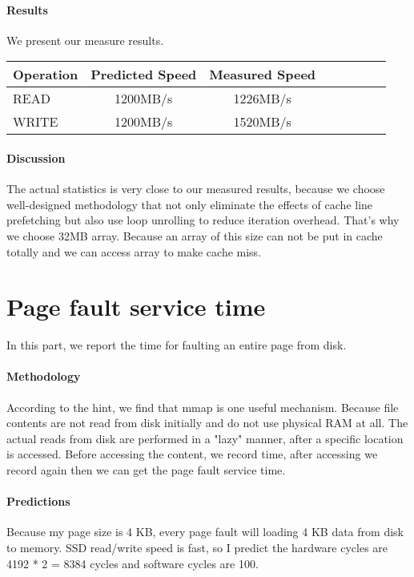 \paragraph{Results}
We present our measure results.

\begin{center}
\begin{tabular}{l*{6}{c}r}
Operation             & Predicted Speed & Measured Speed  \\
\hline
READ & 1200MB/s & 1226MB/s \\
WRITE & 1200MB/s & 1520MB/s \\

\end{tabular}
\end{center}

\paragraph{Discussion}
The actual statistics is very close to our measured results, because we choose well-designed methodology that not only eliminate the effects of cache line prefetching but also use loop unrolling to reduce iteration overhead. That's why we choose 32MB array. Because an array of this size can not be put in cache totally and we can access array to make cache miss.

\section{Page fault service time}
In this part, we report the time for faulting an entire page from disk.

\paragraph{Methodology}
According to the hint, we find that mmap is one useful mechanism. Because file contents are not read from disk initially and do not use physical RAM at all. The actual reads from disk are performed in a "lazy" manner, after a specific location is accessed. Before accessing the content, we record time, after accessing we record again then we can get the page fault service time.

\paragraph{Predictions}
Because my page size is 4 KB, every page fault will loading 4 KB data from disk to memory. SSD read/write speed is fast, so I predict the hardware cycles are 4192 * 2 = 8384 cycles and software cycles are 100.

